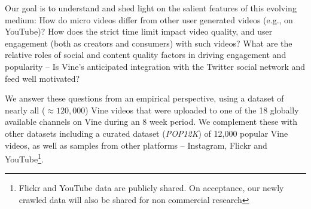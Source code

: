 Our goal is to understand and shed light on the salient features of this evolving medium: How do micro videos differ from other user generated videos (e.g., on YouTube)? How does the strict time limit impact video quality, and user engagement (both as creators and consumers) with such videos? %
 What are the relative roles of  social and content quality factors in driving engagement and popularity -- Is Vine's anticipated integration with the Twitter social network and feed well motivated? 

We answer these questions from an empirical perspective, using a dataset of nearly all ($\approx 120,000$) Vine videos that were uploaded to one of the 18 globally available channels on Vine during an 8 week period. We complement these with other datasets including a curated dataset (\emph{POP12K}) of 12,000 popular Vine videos, as well as samples from other platforms -- Instagram, Flickr and YouTube\footnote{Flickr and YouTube data are publicly shared. On acceptance, our newly crawled data will also be shared  for non commercial research}.
 
 



